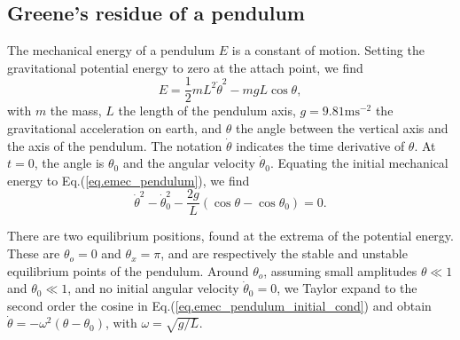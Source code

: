 \documentclass[my_thesis.tex]{subfiles}
\begin{document}
\subsection{Greene's residue of a pendulum}
The mechanical energy of a pendulum $E$ is a constant of motion. Setting the gravitational potential energy to zero at the attach point, we find
\begin{equation}
	E = \frac{1}{2}mL^2\dot{\theta}^2 - mgL\cos\theta, \label{eq.emec_pendulum}
\end{equation}
with $m$ the mass, $L$ the length of the pendulum axis, $g=9.81\text{ms}^{-2}$ the gravitational acceleration on earth, and $\theta$ the angle between the vertical axis and the axis of the pendulum. The notation $\dot\theta$ indicates the time derivative of $\theta$. At $t=0$, the angle is $\theta_0$ and the angular velocity $\dot\theta_0$. Equating the initial mechanical energy to Eq.(\ref{eq.emec_pendulum}), we find
\begin{equation}
	\dot\theta^2-\dot\theta_0^2 - \frac{2g}{L}(\cos\theta-\cos\theta_0) = 0.\label{eq.emec_pendulum_initial_cond}
\end{equation}

There are two equilibrium positions, found at the extrema of the potential energy. These are $\theta_o=0$ and $\theta_x=\pi$, and are respectively the stable and unstable equilibrium points of the pendulum. Around $\theta_o$, assuming small amplitudes $\theta\ll 1$ and $\theta_0\ll 1$, and no initial angular velocity $\dot\theta_0 = 0$, we Taylor expand to the second order the cosine in Eq.(\ref{eq.emec_pendulum_initial_cond}) and obtain $\dot\theta = -\omega^2(\theta-\theta_0)$, with $\omega=\sqrt{g/L}$.
\end{document}
